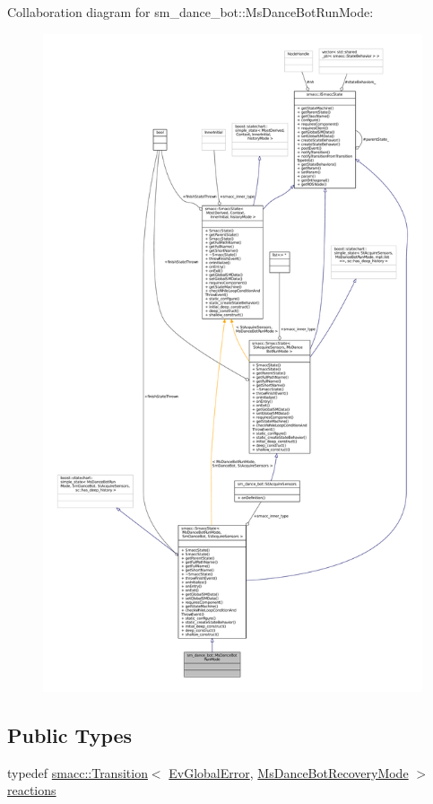 Collaboration diagram for sm\+\_\+dance\+\_\+bot\+:\+:Ms\+Dance\+Bot\+Run\+Mode\+:
\nopagebreak
\begin{figure}[H]
\begin{center}
\leavevmode
\includegraphics[height=550pt]{classsm__dance__bot_1_1MsDanceBotRunMode__coll__graph}
\end{center}
\end{figure}
\subsection*{Public Types}
\begin{DoxyCompactItemize}
\item 
typedef \hyperlink{classsmacc_1_1Transition}{smacc\+::\+Transition}$<$ \hyperlink{structsm__dance__bot_1_1EvGlobalError}{Ev\+Global\+Error}, \hyperlink{classsm__dance__bot_1_1MsDanceBotRecoveryMode}{Ms\+Dance\+Bot\+Recovery\+Mode} $>$ \hyperlink{classsm__dance__bot_1_1MsDanceBotRunMode_a6c0769229c9d5601d25c82c2bead6b33}{reactions}
\end{DoxyCompactItemize}
